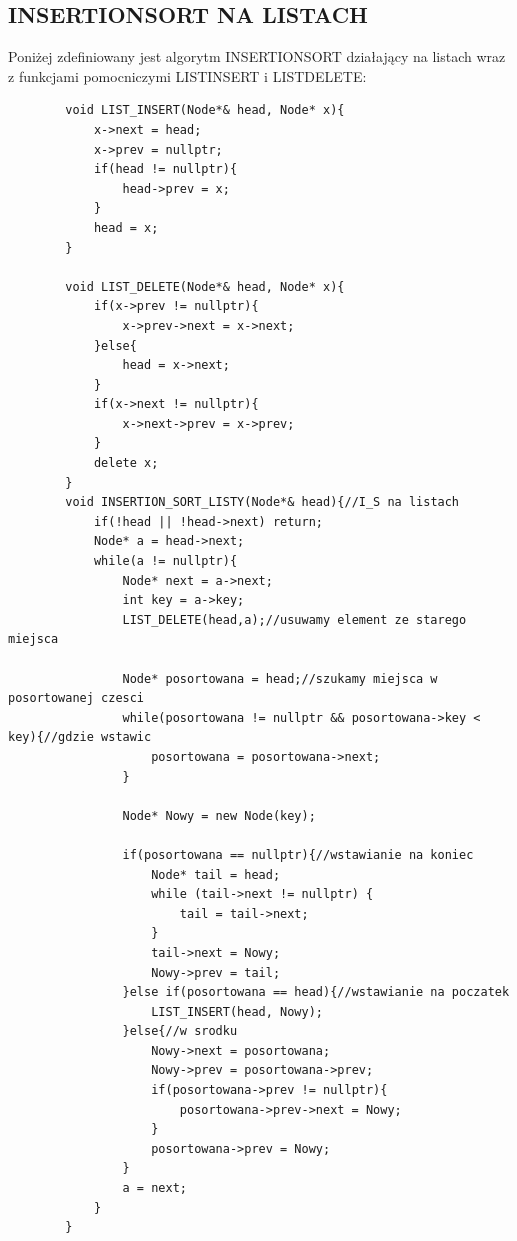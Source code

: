 \documentclass{article}
\begin{document}
	\subsection*{INSERTIONSORT NA LISTACH}
	Poniżej zdefiniowany jest algorytm INSERTIONSORT działający na listach wraz z funkcjami pomocniczymi LISTINSERT i LISTDELETE:
	\begin{verbatim}
		void LIST_INSERT(Node*& head, Node* x){
			x->next = head;
			x->prev = nullptr;
			if(head != nullptr){
				head->prev = x;
			}
			head = x;
		}
		
		void LIST_DELETE(Node*& head, Node* x){
			if(x->prev != nullptr){
				x->prev->next = x->next;
			}else{
				head = x->next;
			}
			if(x->next != nullptr){
				x->next->prev = x->prev;
			}
			delete x;
		}
		void INSERTION_SORT_LISTY(Node*& head){//I_S na listach
			if(!head || !head->next) return;
			Node* a = head->next;
			while(a != nullptr){
				Node* next = a->next;
				int key = a->key;
				LIST_DELETE(head,a);//usuwamy element ze starego miejsca
				
				Node* posortowana = head;//szukamy miejsca w posortowanej czesci
				while(posortowana != nullptr && posortowana->key < key){//gdzie wstawic
					posortowana = posortowana->next;
				}
				
				Node* Nowy = new Node(key);
				
				if(posortowana == nullptr){//wstawianie na koniec
					Node* tail = head;
					while (tail->next != nullptr) {
						tail = tail->next;
					}
					tail->next = Nowy;
					Nowy->prev = tail;
				}else if(posortowana == head){//wstawianie na poczatek
					LIST_INSERT(head, Nowy);
				}else{//w srodku
					Nowy->next = posortowana;
					Nowy->prev = posortowana->prev;
					if(posortowana->prev != nullptr){
						posortowana->prev->next = Nowy;
					}
					posortowana->prev = Nowy;
				}
				a = next;
			}
		}
	\end{verbatim}
\end{document}
